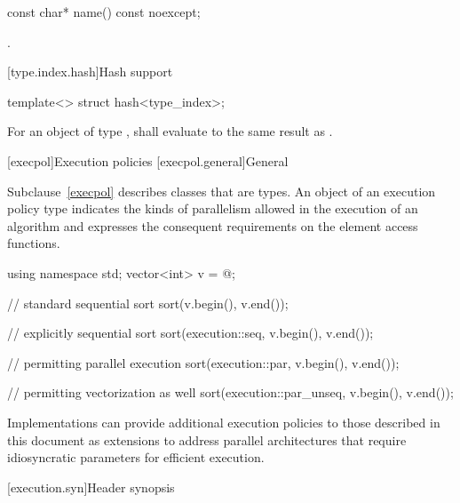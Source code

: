 %
\begin{itemdecl}
const char* name() const noexcept;
\end{itemdecl}

\begin{itemdescr}
\pnum
\returns
{}.
\end{itemdescr}

[type.index.hash]{Hash support}

%
\begin{itemdecl}
template<> struct hash<type_index>;
\end{itemdecl}

\begin{itemdescr}
\pnum
For an object  of type ,
 shall evaluate to the same result as .
\end{itemdescr}

[execpol]{Execution policies}
[execpol.general]{General}

\pnum
Subclause~\ref{execpol} describes classes that are  types. An
object of an execution policy type indicates the kinds of parallelism allowed
in the execution of an algorithm and expresses the consequent requirements on
the element access functions.
\begin{example}
\begin{codeblock}
using namespace std;
vector<int> v = @\commentellip@;

// standard sequential sort
sort(v.begin(), v.end());

// explicitly sequential sort
sort(execution::seq, v.begin(), v.end());

// permitting parallel execution
sort(execution::par, v.begin(), v.end());

// permitting vectorization as well
sort(execution::par_unseq, v.begin(), v.end());
\end{codeblock}
\end{example}
\begin{note}
Implementations can provide additional execution policies
to those described in this document as extensions
to address parallel architectures that require idiosyncratic
parameters for efficient execution.
\end{note}

[execution.syn]{Header  synopsis}

